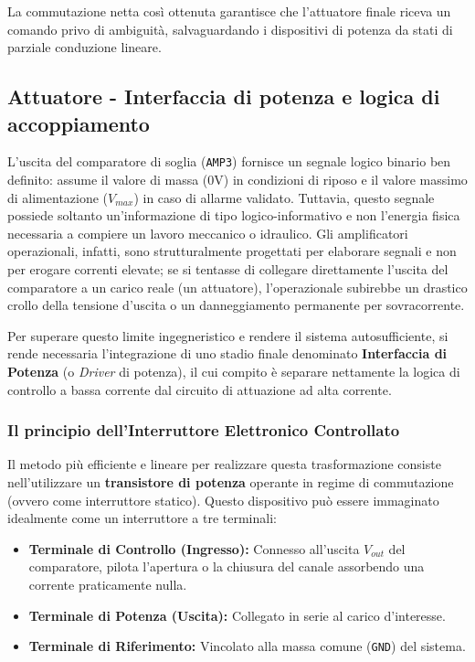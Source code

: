 \documentclass[12pt,a4paper]{article}
\begin{document}
        La commutazione netta così ottenuta garantisce che l'attuatore finale riceva un comando privo di ambiguità, salvaguardando i dispositivi di potenza da stati di parziale conduzione lineare.

    \subsection{Attuatore - Interfaccia di potenza e logica di accoppiamento}
        L'uscita del comparatore di soglia (\texttt{AMP3}) fornisce un segnale logico binario ben definito: assume il valore di massa ($0\text{V}$) in condizioni 
        di riposo e il valore massimo di alimentazione ($V_{max}$) in caso di allarme validato. Tuttavia, questo segnale possiede soltanto un'informazione di tipo 
        logico-informativo e non l'energia fisica necessaria a compiere un lavoro meccanico o idraulico. Gli amplificatori operazionali, infatti, sono strutturalmente 
        progettati per elaborare segnali e non per erogare correnti elevate; se si tentasse di collegare direttamente l'uscita del comparatore a un carico reale (un attuatore), 
        l'operazionale subirebbe un drastico crollo della tensione d'uscita o un danneggiamento permanente per sovracorrente.

        Per superare questo limite ingegneristico e rendere il sistema autosufficiente, si rende necessaria l'integrazione di uno stadio finale denominato \textbf{Interfaccia di Potenza} 
        (o \textit{Driver} di potenza), il cui compito è separare nettamente la logica di controllo a bassa corrente dal circuito di attuazione ad alta corrente.

        \subsubsection{Il principio dell'Interruttore Elettronico Controllato}
            Il metodo più efficiente e lineare per realizzare questa trasformazione consiste nell'utilizzare un \textbf{transistore di potenza} operante in regime di commutazione 
            (ovvero come interruttore statico). Questo dispositivo può essere immaginato idealmente come un interruttore a tre terminali:
            
            \begin{itemize}
                \item \textbf{Terminale di Controllo (Ingresso):} Connesso all'uscita $V_{out}$ del comparatore, pilota l'apertura o la chiusura del canale assorbendo una corrente praticamente nulla.
                \item \textbf{Terminale di Potenza (Uscita):} Collegato in serie al carico d'interesse.
                \item \textbf{Terminale di Riferimento:} Vincolato alla massa comune (\texttt{GND}) del sistema.
            \end{itemize}
\end{document}
